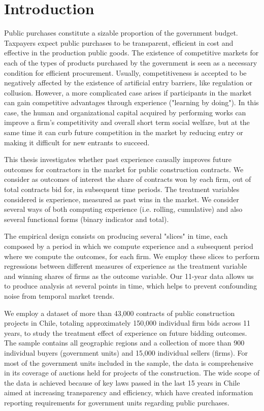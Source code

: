 \chapter{Introduction}
Public purchases constitute a sizable proportion of the government budget. Taxpayers expect public purchases to be transparent, efficient in cost and effective in the production public goods. The existence of competitive markets for each of the types of products purchased by the government is seen as a necessary condition for efficient procurement. Usually, competitiveness is accepted to be negatively affected by the existence of artificial entry barriers, like regulation or collusion. However, a more complicated case arises if participants in the market can gain competitive advantages through experience ("learning by doing"). In this case, the human and organizational capital acquired by performing works can improve a firm's competitivity and overall short term social welfare, but at the same time it can curb future competition in the market by reducing entry or making it difficult for new entrants to succeed.

This thesis investigates whether past experience causally improves future outcomes for contractors in the market for public construction contracts.  We consider as outcomes of interest the share of contracts won by each firm, out of total contracts bid for, in subsequent time periods. The treatment variables considered is experience, measured as past wins in the market. We consider several ways of both computing experience (i.e. rolling, cumulative) and also several functional forms (binary indicator and total).

The empirical design consists on producing several "slices" in time, each composed by a period in which we compute experience and a subsequent period where we compute the outcomes, for each firm. We employ these slices to perform regressions between different measures of experience as the treatment variable and winning shares of firms as the outcome variable. Our 11-year data allows us to produce analysis at several points in time, which helps to prevent confounding noise from temporal market trends.

We employ a dataset of more than 43,000 contracts of public construction projects in Chile, totaling approximately 150,000 individual firm bids across 11 years, to study the treatment effect of experience on future bidding outcomes. The sample contains all geographic regions and a collection of more than 900 individual buyers (government units) and 15,000 individual sellers (firms). For most of the government units included in the sample, the data is comprehensive in its coverage of auctions held for projects of the construction. The wide scope of the data is achieved because of key laws passed in the last 15 years in Chile aimed at increasing transparency and efficiency, which have created information reporting requirements for government units regarding public purchases.

